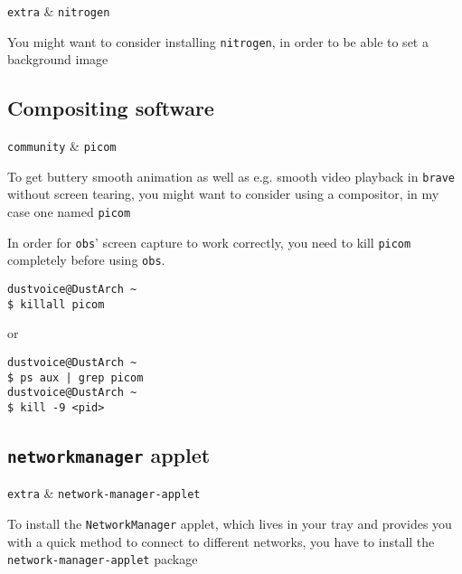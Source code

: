 \documentclass[10pt]{dustdoc}
\begin{document}
\begin{packagetable}
    \texttt{extra} & \texttt{nitrogen} \\
\end{packagetable}

You might want to consider installing \texttt{nitrogen}, in order to be able to set a background image

\subsection{Compositing software}
\label{sec:compositing-software}

\begin{packagetable}
    \texttt{community} & \texttt{picom} \\
\end{packagetable}

To get buttery smooth animation as well as e.g. smooth video playback in \texttt{brave} without screen tearing, you might want to consider using a compositor, in my case one named \texttt{picom}

\begin{WARNING}
    In order for \texttt{obs}' screen capture to work correctly, you need to kill \texttt{picom} completely before using \texttt{obs}.

    \begin{verbatim}
dustvoice@DustArch ~
$ killall picom
    \end{verbatim}

    \noindent
    or

    \begin{verbatim}
dustvoice@DustArch ~
$ ps aux | grep picom
dustvoice@DustArch ~
$ kill -9 <pid>
    \end{verbatim}
\end{WARNING}

\subsection{\texttt{networkmanager} applet}
\label{sec:networkmanager-applet}

\begin{packagetable}
    \texttt{extra} & \texttt{network-manager-applet} \\
\end{packagetable}

To install the \texttt{NetworkManager} applet, which lives in your tray and provides you with a quick method to connect to different networks, you have to install the \texttt{network-manager-applet} package
\end{document}
